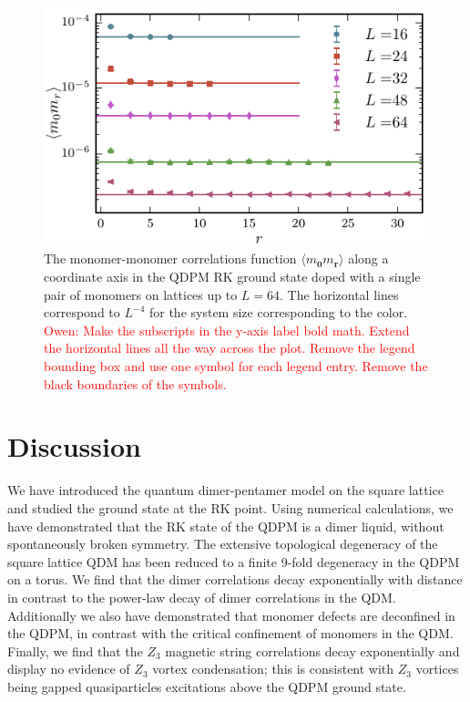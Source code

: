 \documentclass[twocolumn,prb,aps,floatfix,superscriptaddress]{revtex4-1}
\newcommand{\note}[1]{\textcolor{red}{#1}}
\begin{document}
    \begin{figure}[]
        \centering
        \includegraphics[width=1.0\columnwidth]{monomer_cor_log.pdf}
        \caption{ The monomer-monomer correlations function $\langle m_{\bm{0}} m_{\bm{r}} \rangle$ along a coordinate axis in the QDPM RK ground state doped with a single pair of monomers on lattices up to $L=64$. The horizontal lines correspond to $L^{-4}$ for the system size corresponding to the color. \note{Owen: Make the subscripts in the y-axis label bold math. Extend the horizontal lines all the way across the plot. Remove the legend bounding box and use one symbol for each legend entry. Remove the black boundaries of the symbols.}}
        \label{fig:monomer_correlations}
    \end{figure}


\section{Discussion}

We have introduced the quantum dimer-pentamer model on the square lattice and studied the ground state at the RK point. Using numerical calculations, we have demonstrated that the RK state of the QDPM is a dimer liquid, without spontaneously broken symmetry. The extensive topological degeneracy of the square lattice QDM has been reduced to a finite 9-fold degeneracy in the QDPM on a torus. We find that the dimer correlations decay exponentially with distance in contrast to the power-law decay of dimer correlations in the QDM. Additionally we also have demonstrated that monomer defects are deconfined in the QDPM, in contrast with the critical confinement of monomers in the QDM. Finally, we find that the $Z_3$ magnetic string correlations decay exponentially and display no evidence of $Z_3$ vortex condensation; this is consistent with $Z_3$ vortices being gapped quasiparticles excitations above the QDPM ground state. 
\end{document}
